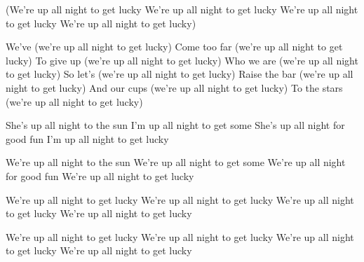 \documentclass[../../songbookMain]{subfiles}
\begin{document}
\begin{guitar}
\begin{multicols}{2}
(We're up all night to get lucky
We're up all night to get lucky
We're up all night to get lucky
We're up all night to get lucky)

We've (we're up all night to get lucky)
Come too far (we're up all night to get lucky)
To give up (we're up all night to get lucky)
Who we are (we're up all night to get lucky)
So let's (we're up all night to get lucky)
Raise the bar (we're up all night to get lucky)
And our cups (we're up all night to get lucky)
To the stars (we're up all night to get lucky)

She's up all night to the sun
I'm up all night to get some
She's up all night for good fun
I'm up all night to get lucky

We're up all night to the sun
We're up all night to get some
We're up all night for good fun
We're up all night to get lucky

We're up all night to get lucky
We're up all night to get lucky
We're up all night to get lucky
We're up all night to get lucky

We're up all night to get lucky
We're up all night to get lucky
We're up all night to get lucky
We're up all night to get lucky
  \end{multicols}
\end{guitar}
\end{document}
